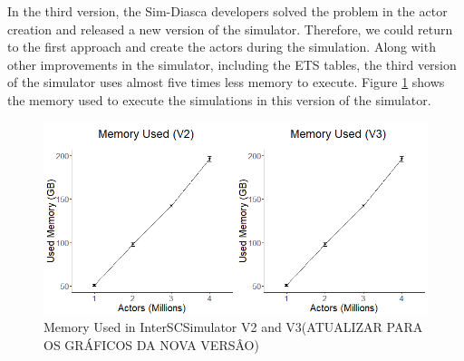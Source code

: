 In the third version, the Sim-Diasca developers solved the problem in the actor creation and released a new version of the simulator. Therefore, we could return to the first approach and create the actors during the simulation. Along with other improvements in the simulator, including the ETS tables, the third version of the simulator uses almost five times less memory to execute. Figure \ref{fig:memory_used} shows the memory used to execute the simulations in this version of the simulator.

\begin{figure}[!htb]
\centering
\includegraphics[width=1.0\textwidth]{figuras/chap-interscsimulator/memory_used.png}
\caption{Memory Used in InterSCSimulator V2 and V3(ATUALIZAR PARA OS GRÁFICOS DA NOVA VERSÂO)}
\label{fig:memory_used}
\end{figure}